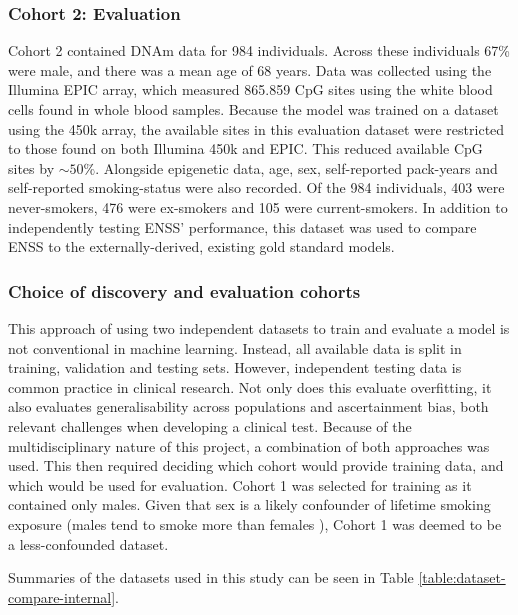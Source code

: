 \documentclass[draft]{article} %
\begin{document}
\subsubsection{Cohort 2: Evaluation}
Cohort 2 contained DNAm data for 984 individuals. Across these individuals 67\% were male, and there was a mean age of 68 years. Data was collected using the Illumina EPIC array, which measured \num{865,859} CpG sites using the white blood cells found in whole blood samples. Because the model was trained on a dataset using the 450k array, the available sites in this evaluation dataset were restricted to those found on both Illumina 450k and EPIC. This reduced available CpG sites by \(\sim\!50\%\). Alongside epigenetic data, age, sex, self-reported pack-years and self-reported smoking-status were also recorded. Of the 984 individuals, 403 were never-smokers, 476 were ex-smokers and 105 were current-smokers. In addition to independently testing ENSS' performance, this dataset was used to compare ENSS to the externally-derived, existing gold standard models.

\subsubsection{Choice of discovery and evaluation cohorts}
This approach of using two independent datasets to train and evaluate a model is not conventional in machine learning. Instead, all available data is split in training, validation and testing sets. However, independent testing data is common practice in clinical research. Not only does this evaluate overfitting, it also evaluates generalisability across populations and ascertainment bias, both relevant challenges when developing a clinical test. Because of the multidisciplinary nature of this project, a combination of both approaches was used. This then required deciding which cohort would provide training data, and which would be used for evaluation. Cohort 1 was selected for training as it contained only males. Given that sex is a likely confounder of lifetime smoking exposure (males tend to smoke more than females \cite{WHO2021Tobacco, higgins2015literature}), Cohort 1 was deemed to be a less-confounded dataset.

Summaries of the datasets used in this study can be seen in Table \ref{table:dataset-compare-internal}.

\end{document}
